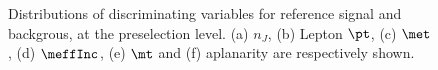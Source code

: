 \begin{figure}[h]
    \caption{ 
    Distributions of discriminating variables for reference signal and backgrous, at the preselection level.
    (a) $n_J$, (b) Lepton $\pt$, (c) $\met$, (d) $\meffInc$, (e) $\mt$ and (f) aplanarity are respectively shown.
    \label{fig::SRdefinition::distVar1}       
    }
\end{figure}

